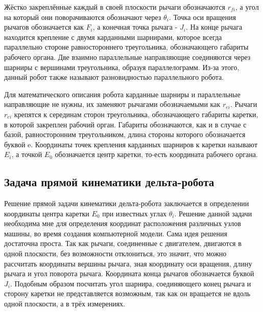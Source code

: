Жёстко закреплённые каждый в своей плоскости рычаги обозначаются $r_{fi}$, а угол на который они
поворачиваются обозначают через $\theta_{i}$. Точка оси вращения рычагов обозначается как $F_{i}$, а конечная точка рычага - $J_{i}$. На конце рычага находится крепление с двумя карданными шарнирами, которое всегда параллельно стороне равностороннего треугольника, обозначающего габариты рабочего органа. Две взаимно параллельные направляющие соединяются через шарниры с вершинами треугольника, образуя параллелограмм. Из-за этого, данный робот также называют разновидностью параллельного робота.

Для математического описания робота карданные шарниры и параллельные направляющие не нужны, их заменяют рычагами обозначаемыми как $r_{ei}$. Рычаги $r_{ei}$ крепятся к серединам сторон треугольника, обозначающего габариты каретки, в которой закреплен рабочий орган. Габариты обозначаются, как и в случае с базой, равносторонним треугольником, длина стороны  которого обозначается буквой e. Координаты точек крепления карданных шарниров к каретки называют $E_{i}$, а точкой $E_{0}$ обозначается центр каретки, то-есть координата рабочего органа.

\subsection{Задача прямой кинематики дельта-робота}
Решение прямой задачи кинематики дельта-робота заключается в определении координаты центра каретки $E_{0}$ при известных углах $\theta_{i}$. Решение данной задачи необходима мне для определения координат расположения различных узлов машины, во время создания компьютерной модели. Сама идея решения достаточна проста. Так как рычаги, соединенные с двигателем, двигаются в одной плоскости, без возможности отклониться, это значит, что можно рассчитать координаты вершины рычага, зная координату оси вращения, длину рычага и угол поворота рычага. Координата конца рычагов обозначается буквой $J_{i}$. Подобным образом посчитать угол шарнира, соединяющего конец рычага и сторону каретки не представляется возможным, так как он вращается не вдоль одной плоскости, а в трёх измерениях.

